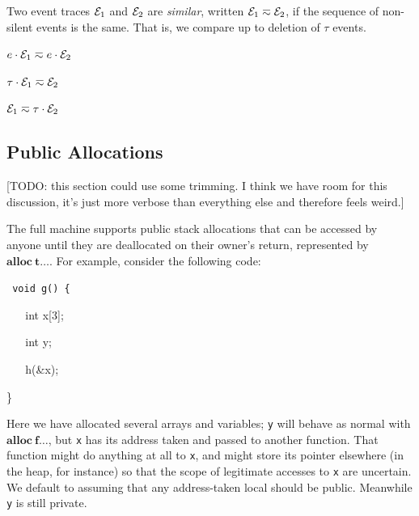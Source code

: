 \documentclass[10pt,conference]{ieeetran}%
\theoremstyle{definition}
\begin{document}
Two event traces $\mathcal{E}_1$ and $\mathcal{E}_2$ are {\em similar},
written \(\mathcal{E}_1 \eqsim \mathcal{E}_2\), if the sequence of non-silent events
is the same. That is, we compare up to deletion of \(\tau\) events.

\begin{minipage}{.4\columnwidth}
  \judgment{}{\(\obsT \eqsim \obsT\)}
\end{minipage}
\begin{minipage}{.4\columnwidth}
           {\(e \cdot \mathcal{E}_1 \eqsim e \cdot \mathcal{E}_2\)}
\end{minipage}

\begin{minipage}{.4\columnwidth}
           {\(\tau \cdot \mathcal{E}_1 \eqsim \mathcal{E}_2\)}
\end{minipage}
\begin{minipage}{.4\columnwidth}
           {\(\mathcal{E}_1 \eqsim \tau \cdot \mathcal{E}_2\)}
\end{minipage}

\subsection{Public Allocations}

[TODO: this section could use some trimming. I think we have room for this
discussion, it's just more verbose than everything else and therefore feels weird.]

The full machine supports public stack allocations that can
be accessed by anyone until they are deallocated on their owner's return,
represented by \(\mathbf{alloc} ~ \mathbf{t} \dots\).
For example, consider the following code:

{\tt
  void g() \{

  ~ ~ int x[3];

  ~ ~ int y;

  ~ ~ h(\&x);

  \}
}

Here we have allocated several arrays and variables; {\tt y}
will behave as normal with \(\mathbf{alloc} ~ \mathbf{f} \dots\), but
{\tt x} has its address taken and passed to another function. That
function might do anything at all to {\tt x}, and might store its pointer
elsewhere (in the heap, for instance) so that the scope of legitimate accesses
to {\tt x} are uncertain. We default to assuming that any address-taken local
should be public. Meanwhile {\tt y} is still private.
\end{document}
